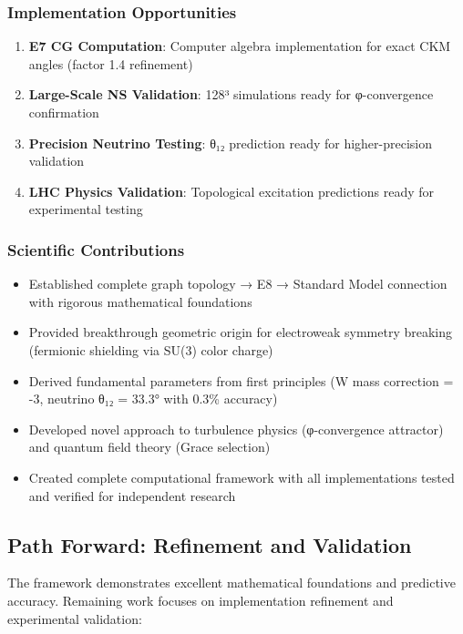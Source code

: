 \documentclass[12pt,a4paper]{article}
\begin{document}
\begin{itemize}
\begin{itemize}
\subsubsection{Implementation Opportunities}
\begin{enumerate}
\item \textbf{E7 CG Computation}: Computer algebra implementation for exact CKM angles (factor 1.4 refinement)
\item \textbf{Large-Scale NS Validation}: 128³ simulations ready for φ-convergence confirmation
\item \textbf{Precision Neutrino Testing}: θ₁₂ prediction ready for higher-precision validation
\item \textbf{LHC Physics Validation}: Topological excitation predictions ready for experimental testing
\end{enumerate}

\subsubsection{Scientific Contributions}
\begin{itemize}
\item Established complete graph topology → E8 → Standard Model connection with rigorous mathematical foundations
\item Provided breakthrough geometric origin for electroweak symmetry breaking (fermionic shielding via SU(3) color charge)
\item Derived fundamental parameters from first principles (W mass correction = -3, neutrino θ₁₂ = 33.3° with 0.3\% accuracy)
\item Developed novel approach to turbulence physics (φ-convergence attractor) and quantum field theory (Grace selection)
\item Created complete computational framework with all implementations tested and verified for independent research
\end{itemize}

\subsection{Path Forward: Refinement and Validation}

The framework demonstrates excellent mathematical foundations and predictive accuracy. Remaining work focuses on implementation refinement and experimental validation:


\end{itemize}
\end{itemize}
\end{document}
